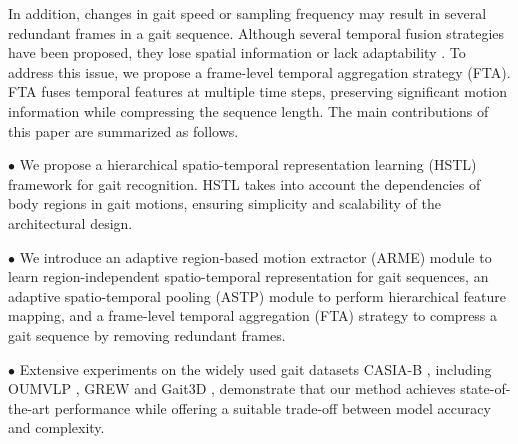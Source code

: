 \documentclass[10pt,twocolumn,letterpaper]{article}
\begin{document}
In addition, changes in gait speed or sampling frequency may result in several redundant frames in a gait sequence. Although several temporal fusion strategies have been proposed, they lose spatial information \cite{fan2020gaitpart,huang2021context} or lack adaptability \cite{lin2021gait,lin2021gaitmask}. To address this issue, we propose a frame-level temporal aggregation strategy (FTA). FTA fuses temporal features at multiple time steps, preserving significant motion information while compressing the sequence length. The main contributions of this paper are summarized as follows.











$\bullet$ We propose a hierarchical spatio-temporal representation learning (HSTL) framework for gait recognition. HSTL takes into account the dependencies of body regions in gait motions, ensuring simplicity and scalability of the architectural design.

$\bullet$ We introduce an adaptive region-based motion extractor (ARME) module to learn region-independent spatio-temporal representation for gait sequences, an adaptive spatio-temporal pooling (ASTP) module to perform hierarchical feature mapping, and a frame-level temporal aggregation (FTA) strategy to compress a gait sequence by removing redundant frames.

$\bullet$ Extensive experiments on the widely used gait datasets CASIA-B \cite{yu2006framework}, including OUMVLP \cite{NorikoTakemura2018MultiviewLP}, GREW \cite{zhu2021gait} and Gait3D \cite{zheng2022gait}, demonstrate that our method achieves state-of-the-art performance while offering a suitable trade-off between model accuracy and complexity.
\end{document}

